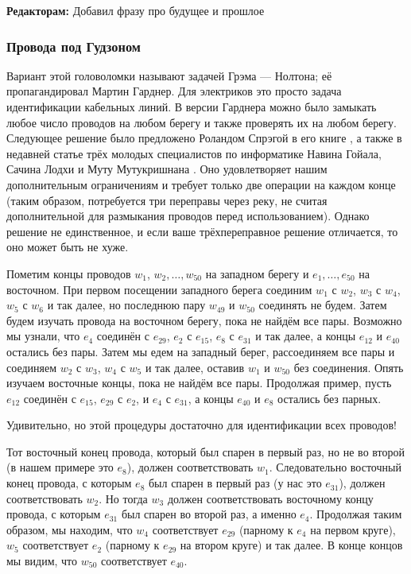 \begin{addedbytheeditors}
\textbf{Редакторам:} Добавил фразу про будущее и прошлое
\end{addedbytheeditors}


\subsubsection*{Провода под Гудзоном}

Вариант этой головоломки называют задачей Грэма --- Нолтона;
её пропагандировал Мартин Гарднер.
Для электриков это просто задача идентификации кабельных линий.
В версии Гарднера можно было замыкать любое число проводов на любом берегу и также проверять их на любом берегу.
Следующее решение было предложено Роландом Спрэгой в его книге \cite{54}, а также в недавней статье трёх молодых специалистов по информатике Навина Гойала, Сачина Лодхи и Муту Мутукришнана \cite{33}.
Оно удовлетворяет нашим дополнительным ограничениям и требует только две операции на каждом конце (таким образом, потребуется три переправы через реку, не считая дополнительной для размыкания проводов перед использованием).
Однако решение не единственное, и если ваше трёхпереправное решение отличается, то оно может быть не хуже.

Пометим концы проводов $w_1$, $w_2, \dots, w_{50}$ на западном берегу
и $e_1, \dots, e_{50}$ на восточном. %
При первом посещении западного берега соединим $w_1$ с $w_2$, $w_3$ с $w_4$, $w_5$ с $w_6$ и так далее, но последнюю пару $w_{49}$ и $w_{50}$ соединять не будем.
Затем будем изучать провода на восточном берегу, пока не найдём все пары.
Возможно мы узнали, что $e_4$ соединён с $e_{29}$, $e_2$ с $e_{15}$, $e_8$ с $e_{31}$ и так далее, а концы $e_{12}$ и $e_{40}$ остались без пары.
Затем мы едем на западный берег, рассоединяем все пары и соединяем $w_2$ с $w_3$, $w_4$ с $w_5$ и так далее, оставив $w_1$ и $w_{50}$ без соединения.
Опять изучаем восточные концы, пока не найдём все пары.
Продолжая пример, пусть $e_{12}$ соединён с $e_{15}$, $e_{29}$ с $e_2$, и $e_4$ с $e_{31}$, а концы $e_{40}$ и $e_8$ остались без парных.

Удивительно, но этой процедуры достаточно для идентификации всех проводов!

Тот восточный конец провода, который был спарен в первый раз, но не во второй (в нашем примере это $e_8$), должен соответствовать $w_1$.
Следовательно восточный конец провода, с которым $e_8$ был спарен в первый раз (у нас это $e_{31}$), должен соответствовать $w_2$.
Но тогда $w_3$ должен соответствовать восточному концу провода, с которым $e_{31}$ был спарен во второй раз, а именно $e_4$.
Продолжая таким образом, мы находим, что $w_4$ соответствует $e_{29}$ (парному к $e_4$ на первом круге), $w_5$ соответствует $e_2$ (парному к $e_{29}$ на втором круге) и так далее.
В конце концов мы видим, что $w_{50}$ соответствует $e_{40}$.

